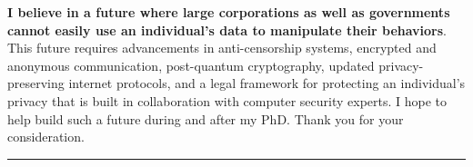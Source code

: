 \documentclass{article}
\newcommand{\Hrule}{\rule{\linewidth}{0.3mm}}
\begin{document}
\textbf{I believe in a future where large corporations as well as governments cannot easily use an individual's data to manipulate their behaviors}. This future requires advancements in anti-censorship systems, encrypted and anonymous communication, post-quantum cryptography, updated privacy-preserving internet protocols, and a legal framework for protecting an individual's privacy that is built in collaboration with computer security experts. I hope to help build such a future during and after my PhD. Thank you for your consideration.



% 

\vspace{0.5cm}
\Hrule

\def\notesname{\small{Footnotes \& References}}
\theendnotes
\end{document}

